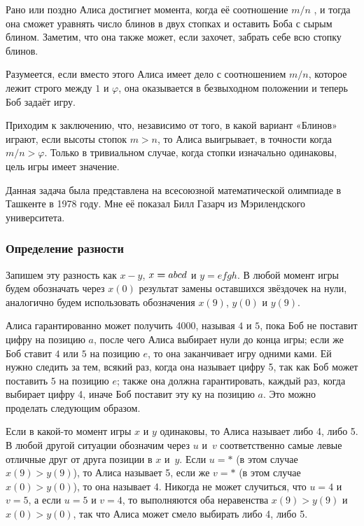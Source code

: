 \documentclass[twoside]{book}
\begin{document}
Рано или поздно Алиса достигнет момента, когда её соотношение $m/n$ , и тогда она сможет уравнять число блинов в двух стопках и оставить Боба с сырым блином.
Заметим, что она также может, если захочет, забрать себе всю стопку блинов.

Разумеется, если вместо этого Алиса имеет дело с соотношением $m/n$, которое лежит строго между $1$ и $\varphi$, она оказывается в безвыходном положении %
и теперь Боб задаёт игру.

Приходим к заключению, что, независимо от того, в какой вариант «Блинов» играют, если высоты стопок $m>n$, то Алиса выигрывает, в точности когда $m/n>\varphi$.
Только в тривиальном случае, когда стопки изначально одинаковы, цель игры имеет значение.
\heart

Данная задача была представлена на  всесоюзной математической олимпиаде в Ташкенте в 1978 году.
Мне её показал Билл Газарч из Мэрилендского университета.%

\subsubsection*{Определение разности}%

Запишем эту разность как $x-y$,  $x\hm=abcd$ и $y=efgh$.
В любой момент  игры будем обозначать через $x(0)$ результат замены оставшихся звёздочек на нули, аналогично будем использовать обозначения $x(9)$, $y(0)$ и $y(9)$.

Алиса гарантированно может получить 4000, называя $4$ и $5$, пока Боб не поставит цифру на позицию $a$, после чего Алиса выбирает нули до конца игры;
если же Боб ставит $4$ или $5$ на позицию $e$, то она заканчивает игру одними ками.
Ей нужно следить за тем,  всякий раз, когда она называет цифру 5, так как Боб может поставить $5$ на позицию $e$;
также она должна гарантировать,  каждый раз, когда  выбирает цифру 4,  иначе Боб поставит эту ку на позицию $a$.
Это можно проделать следующим образом.

Если в какой-то момент игры $x$ и $y$ одинаковы, то Алиса называет либо 4, либо 5.
В любой другой ситуации обозначим через $u$ и~$v$ соответственно самые левые отличные друг от друга позиции в $x$ и~$y$.
Если $u=*$ (в этом случае $x(9)> y(9)$), то Алиса называет 5, если же $v=*$ (в этом случае $x(0)> y(0)$), то она называет 4.
Никогда не может случиться, что $u=4$ и $v=5$, а если $u=5$ и $v=4$, то выполняются оба неравенства $x(9)> y(9)$ и $x(0)> y(0)$, так что Алиса может смело выбирать либо 4, либо 5.
\end{document}
